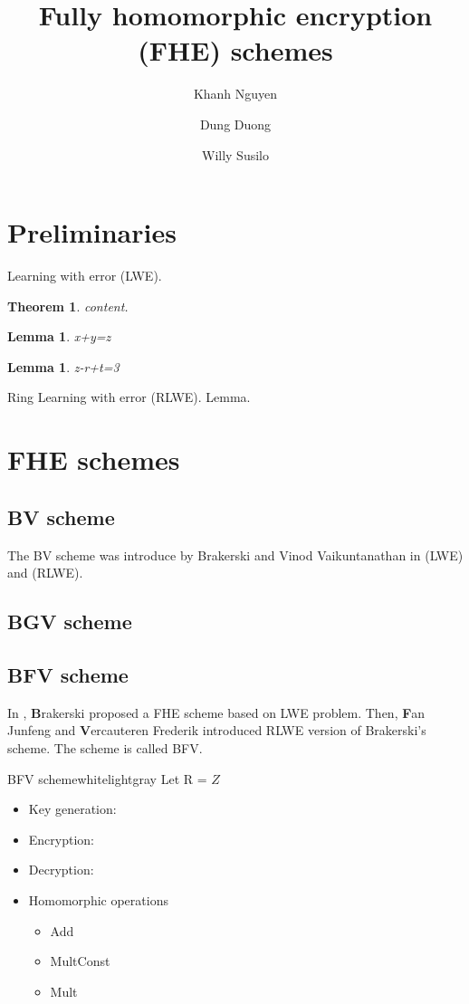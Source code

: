 \documentclass[a4paper]{article}
\title{Fully homomorphic encryption (FHE) schemes}
\author{Khanh Nguyen}
\author{Dung Duong}
\author{Willy Susilo}
\affil{Instutute of Cybersecurity and Cryptology, University of Wollongong, Australia}
\newtheorem{theorem}{Theorem}
\newtheorem{lemma}{Lemma}
\newtheorem{sublemma}{Lemma}[section]
\begin{document}
	
	\maketitle
	
	\section{Preliminaries}
	Learning with error (LWE). 
	\begin{theorem}
		content.
	\end{theorem}
	\begin{lemma}
		x+y=z
	\end{lemma}
	\begin{sublemma}
		z-r+t=3
	\end{sublemma}
	Ring Learning with error (RLWE). Lemma.
	
	
	\section{FHE schemes}
	
	\subsection{BV scheme}
	
	The BV scheme was introduce by Brakerski and Vinod Vaikuntanathan in \cite{brakerski2014efficient} (LWE) and \cite{brakerski2011fully} (RLWE).
	
	\subsection{BGV scheme}
	\cite{brakerski2014leveled}

	\subsection{BFV scheme}
	In , \textbf{B}rakerski \cite{brakerski2012fully} proposed a FHE scheme based on LWE problem. Then, \textbf{F}an Junfeng and \textbf{V}ercauteren Frederik \cite{fan2012somewhat} introduced RLWE version of Brakerski's scheme. The scheme is called BFV.
	 
	\begin{scheme}{BFV scheme}{white}{lightgray}
		Let R = $Z$
		\begin{itemize}
			\item Key generation:
			\item Encryption:
			\item Decryption:
			\item Homomorphic operations
			\begin{itemize}
				\item Add
				\item MultConst
				\item Mult 
			\end{itemize}
		\end{itemize}
	\end{scheme}
	
	
\pagebreak


\end{document}
